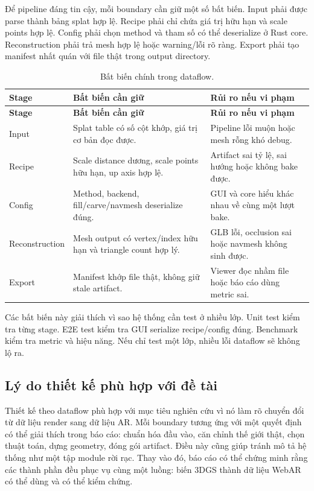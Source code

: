 Để pipeline đáng tin cậy, mỗi boundary cần giữ một số bất biến. Input phải được parse thành bảng splat hợp lệ. Recipe phải chỉ chứa giá trị hữu hạn và scale points hợp lệ. Config phải chọn method và tham số có thể deserialize ở Rust core. Reconstruction phải trả mesh hợp lệ hoặc warning/lỗi rõ ràng. Export phải tạo manifest nhất quán với file thật trong output directory.

\begin{longtable}{p{3.2cm}p{5.5cm}p{4.8cm}}
\caption{Bất biến chính trong dataflow.}\\
\toprule
\textbf{Stage} & \textbf{Bất biến cần giữ} & \textbf{Rủi ro nếu vi phạm}\\
\midrule
\endfirsthead
\toprule
\textbf{Stage} & \textbf{Bất biến cần giữ} & \textbf{Rủi ro nếu vi phạm}\\
\midrule
\endhead
Input & Splat table có số cột khớp, giá trị cơ bản đọc được. & Pipeline lỗi muộn hoặc mesh rỗng khó debug.\\
Recipe & Scale distance dương, scale points hữu hạn, up axis hợp lệ. & Artifact sai tỷ lệ, sai hướng hoặc không bake được.\\
Config & Method, backend, fill/carve/navmesh deserialize đúng. & GUI và core hiểu khác nhau về cùng một lượt bake.\\
Reconstruction & Mesh output có vertex/index hữu hạn và triangle count hợp lý. & GLB lỗi, occlusion sai hoặc navmesh không sinh được.\\
Export & Manifest khớp file thật, không giữ stale artifact. & Viewer đọc nhầm file hoặc báo cáo dùng metric sai.\\
\bottomrule
\end{longtable}

Các bất biến này giải thích vì sao hệ thống cần test ở nhiều lớp. Unit test kiểm tra từng stage. E2E test kiểm tra GUI serialize recipe/config đúng. Benchmark kiểm tra metric và hiệu năng. Nếu chỉ test một lớp, nhiều lỗi dataflow sẽ không lộ ra.

\subsection{Lý do thiết kế phù hợp với đề tài}

Thiết kế theo dataflow phù hợp với mục tiêu nghiên cứu vì nó làm rõ chuyển đổi từ dữ liệu render sang dữ liệu AR. Mỗi boundary tương ứng với một quyết định có thể giải thích trong báo cáo: chuẩn hóa đầu vào, căn chỉnh thế giới thật, chọn thuật toán, dựng geometry, đóng gói artifact. Điều này cũng giúp tránh mô tả hệ thống như một tập module rời rạc. Thay vào đó, báo cáo có thể chứng minh rằng các thành phần đều phục vụ cùng một luồng: biến 3DGS thành dữ liệu WebAR có thể dùng và có thể kiểm chứng.
